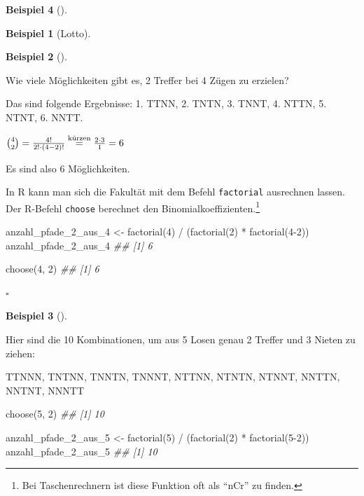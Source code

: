 \documentclass[
  ngerman,
  letterpaper,
  twoside,
  open=any]{scrbook}
\newenvironment{Shaded}{\begin{snugshade}}{\end{snugshade}}
\newcommand{\DecValTok}[1]{\textcolor[rgb]{0.68,0.00,0.00}{#1}}
\newcommand{\DocumentationTok}[1]{\textcolor[rgb]{0.37,0.37,0.37}{\textit{#1}}}
\newcommand{\FunctionTok}[1]{\textcolor[rgb]{0.28,0.35,0.67}{#1}}
\newcommand{\NormalTok}[1]{\textcolor[rgb]{0.00,0.23,0.31}{#1}}
\newcommand{\OtherTok}[1]{\textcolor[rgb]{0.00,0.23,0.31}{#1}}
\newcommand{\SpecialCharTok}[1]{\textcolor[rgb]{0.37,0.37,0.37}{#1}}
\theoremstyle{definition}
\newtheorem{example}{Beispiel}[chapter]
\theoremstyle{plain}
\theoremstyle{definition}
\theoremstyle{definition}
\theoremstyle{remark}
\begin{document}
\begin{example}[]
\begin{example}[Lotto]
\end{example}

\begin{example}[]\protect\hypertarget{exm-2aus4}{}\label{exm-2aus4}

Wie viele Möglichkeiten gibt es, 2 Treffer bei 4 Zügen zu erzielen?

Das sind folgende Ergebnisse: 1. TTNN, 2. TNTN, 3. TNNT, 4. NTTN, 5.
NTNT, 6. NNTT.

\(\tbinom{4}{2} = \frac{4!}{2! \cdot (4-2)!} \overset{\text{kürzen}}= \frac{2\cdot 3}{1}=6\)

Es sind also 6 Möglichkeiten.

\end{example}

In R kann man sich die Fakultät mit dem Befehl \texttt{factorial}
ausrechnen lassen. Der R-Befehl \texttt{choose} berechnet den
Binomialkoeffizienten.\footnote{Bei Taschenrechnern ist diese Funktion
  oft als \enquote{nCr} zu finden.}

\begin{Shaded}
\begin{Highlighting}[]
\NormalTok{anzahl\_pfade\_2\_aus\_4 }\OtherTok{\textless{}{-}} 
  \FunctionTok{factorial}\NormalTok{(}\DecValTok{4}\NormalTok{) }\SpecialCharTok{/}\NormalTok{ (}\FunctionTok{factorial}\NormalTok{(}\DecValTok{2}\NormalTok{) }\SpecialCharTok{*} \FunctionTok{factorial}\NormalTok{(}\DecValTok{4{-}2}\NormalTok{))}
\NormalTok{anzahl\_pfade\_2\_aus\_4}
\DocumentationTok{\#\# [1] 6}

\FunctionTok{choose}\NormalTok{(}\DecValTok{4}\NormalTok{, }\DecValTok{2}\NormalTok{)}
\DocumentationTok{\#\# [1] 6}
\end{Highlighting}
\end{Shaded}

\(\square\)

\begin{example}[]\protect\hypertarget{exm-2aus5}{}\label{exm-2aus5}

Hier sind die 10 Kombinationen, um aus 5 Losen genau 2 Treffer und 3
Nieten zu ziehen:

TTNNN, TNTNN, TNNTN, TNNNT, NTTNN, NTNTN, NTNNT, NNTTN, NNTNT, NNNTT

\begin{Shaded}
\begin{Highlighting}[]
\FunctionTok{choose}\NormalTok{(}\DecValTok{5}\NormalTok{, }\DecValTok{2}\NormalTok{)}
\DocumentationTok{\#\# [1] 10}

\NormalTok{anzahl\_pfade\_2\_aus\_5 }\OtherTok{\textless{}{-}} 
  \FunctionTok{factorial}\NormalTok{(}\DecValTok{5}\NormalTok{) }\SpecialCharTok{/}\NormalTok{ (}\FunctionTok{factorial}\NormalTok{(}\DecValTok{2}\NormalTok{) }\SpecialCharTok{*} \FunctionTok{factorial}\NormalTok{(}\DecValTok{5{-}2}\NormalTok{))}
\NormalTok{anzahl\_pfade\_2\_aus\_5}
\DocumentationTok{\#\# [1] 10}
\end{Highlighting}
\end{Shaded}


\end{example}
\end{example}
\end{document}
